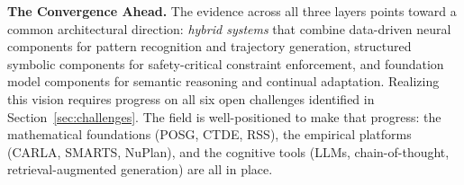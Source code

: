 \documentclass[12pt, a4paper]{article}
\begin{document}
\textbf{The Convergence Ahead.}
The evidence across all three layers points toward a common architectural
direction: \emph{hybrid systems} that combine data-driven neural components for
pattern recognition and trajectory generation, structured symbolic components for
safety-critical constraint enforcement, and foundation model components for
semantic reasoning and continual adaptation. Realizing this vision requires
progress on all six open challenges identified in Section~\ref{sec:challenges}.
The field is well-positioned to make that progress: the mathematical foundations
(POSG, CTDE, RSS), the empirical platforms (CARLA, SMARTS, NuPlan), and the
cognitive tools (LLMs, chain-of-thought, retrieval-augmented generation) are all
in place.



\end{document}
